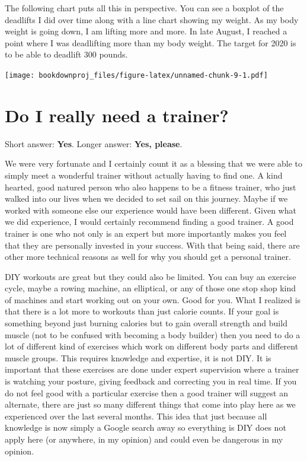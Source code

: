 \documentclass[
  oneside]{book}
\begin{document}
The following chart puts all this in perspective. You can see a boxplot of the deadlifts I did over time along with a line chart showing my weight. As my body weight is going down, I am lifting more and more. In late August, I reached a point where I was deadlifting more than my body weight. The target for 2020 is to be able to deadlift 300 pounds.

\texttt{[image: bookdownproj\_files/figure-latex/unnamed-chunk-9-1.pdf]}

\hypertarget{do-i-really-need-a-trainer}{%
\section{Do I really need a trainer?}\label{do-i-really-need-a-trainer}}

Short answer: \textbf{Yes}. Longer answer: \textbf{Yes, please}.

We were very fortunate and I certainly count it as a blessing that we were able to simply meet a wonderful trainer without actually having to find one. A kind hearted, good natured person who also happens to be a fitness trainer, who just walked into our lives when we decided to set sail on this journey. Maybe if we worked with someone else our experience would have been different. Given what we did experience, I would certainly recommend finding a good trainer. A good trainer is one who not only is an expert but more importantly makes you feel that they are personally invested in your success. With that being said, there are other more technical reasons as well for why you should get a personal trainer.

DIY workouts are great but they could also be limited. You can buy an exercise cycle, maybe a rowing machine, an elliptical, or any of those one stop shop kind of machines and start working out on your own. Good for you. What I realized is that there is a lot more to workouts than just calorie counts. If your goal is something beyond just burning calories but to gain overall strength and build muscle (not to be confused with becoming a body builder) then you need to do a lot of different kind of exercises which work on different body parts and different muscle groups. This requires knowledge and expertise, it is not DIY. It is important that these exercises are done under expert supervision where a trainer is watching your posture, giving feedback and correcting you in real time. If you do not feel good with a particular exercise then a good trainer will suggest an alternate, there are just so many different things that come into play here as we experienced over the last several months. This idea that just because all knowledge is now simply a Google search away so everything is DIY does not apply here (or anywhere, in my opinion) and could even be dangerous in my opinion.
\end{document}
